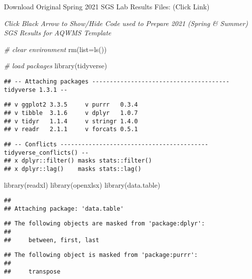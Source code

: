 \documentclass[
]{book}
\newenvironment{Shaded}{\begin{snugshade}}{\end{snugshade}}
\newcommand{\AttributeTok}[1]{\textcolor[rgb]{0.77,0.63,0.00}{#1}}
\newcommand{\CommentTok}[1]{\textcolor[rgb]{0.56,0.35,0.01}{\textit{#1}}}
\newcommand{\FunctionTok}[1]{\textcolor[rgb]{0.00,0.00,0.00}{#1}}
\newcommand{\NormalTok}[1]{#1}
\begin{document}
Download Original Spring 2021 SGS Lab Results Files: (Click Link)

\emph{Click Black Arrow to Show/Hide Code used to Prepare 2021 (Spring \& Summer) SGS Results for AQWMS Template}

\begin{Shaded}
\begin{Highlighting}[]
\CommentTok{\# clear environment}
\FunctionTok{rm}\NormalTok{(}\AttributeTok{list=}\FunctionTok{ls}\NormalTok{())}

\CommentTok{\# load packages}
\FunctionTok{library}\NormalTok{(tidyverse)}
\end{Highlighting}
\end{Shaded}

\begin{verbatim}
## -- Attaching packages --------------------------------------- tidyverse 1.3.1 --
\end{verbatim}

\begin{verbatim}
## v ggplot2 3.3.5     v purrr   0.3.4
## v tibble  3.1.6     v dplyr   1.0.7
## v tidyr   1.1.4     v stringr 1.4.0
## v readr   2.1.1     v forcats 0.5.1
\end{verbatim}

\begin{verbatim}
## -- Conflicts ------------------------------------------ tidyverse_conflicts() --
## x dplyr::filter() masks stats::filter()
## x dplyr::lag()    masks stats::lag()
\end{verbatim}

\begin{Shaded}
\begin{Highlighting}[]
\FunctionTok{library}\NormalTok{(readxl)}
\FunctionTok{library}\NormalTok{(openxlsx)}
\FunctionTok{library}\NormalTok{(data.table)}
\end{Highlighting}
\end{Shaded}

\begin{verbatim}
## 
## Attaching package: 'data.table'
\end{verbatim}

\begin{verbatim}
## The following objects are masked from 'package:dplyr':
## 
##     between, first, last
\end{verbatim}

\begin{verbatim}
## The following object is masked from 'package:purrr':
## 
##     transpose
\end{verbatim}
\end{document}
